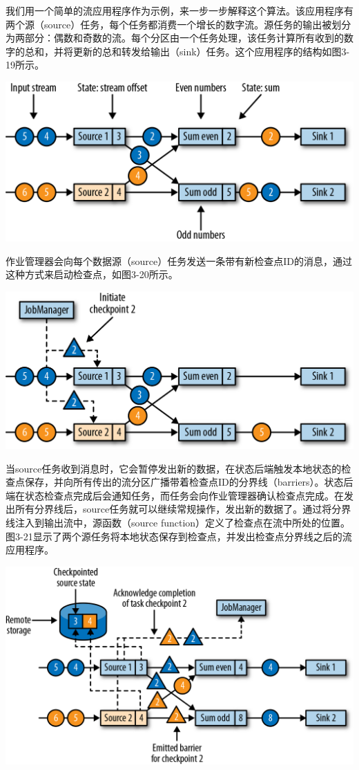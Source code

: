 \documentclass[cn,11pt,chinese]{elegantbook}
\begin{document}
我们用一个简单的流应用程序作为示例，来一步一步解释这个算法。该应用程序有两个源（source）任务，每个任务都消费一个增长的数字流。源任务的输出被划分为两部分：偶数和奇数的流。每个分区由一个任务处理，该任务计算所有收到的数字的总和，并将更新的总和转发给输出（sink）任务。这个应用程序的结构如图3-19所示。

\includegraphics{images/spaf_0319.png}

作业管理器会向每个数据源（source）任务发送一条带有新检查点ID的消息，通过这种方式来启动检查点，如图3-20所示。

\includegraphics{images/spaf_0320.png}

当source任务收到消息时，它会暂停发出新的数据，在状态后端触发本地状态的检查点保存，并向所有传出的流分区广播带着检查点ID的分界线（barriers）。状态后端在状态检查点完成后会通知任务，而任务会向作业管理器确认检查点完成。在发出所有分界线后，source任务就可以继续常规操作，发出新的数据了。通过将分界线注入到输出流中，源函数（source
function）定义了检查点在流中所处的位置。图3-21显示了两个源任务将本地状态保存到检查点，并发出检查点分界线之后的流应用程序。

\includegraphics{images/spaf_0321.png}
\end{document}

